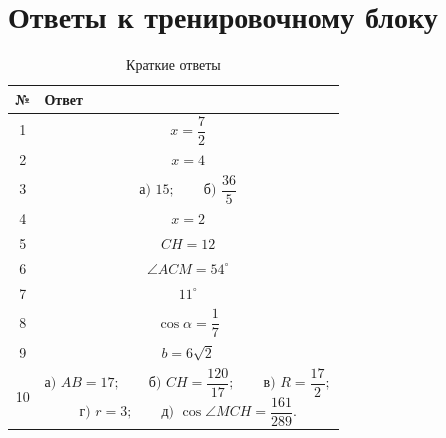 \documentclass[a4paper,12pt]{article}
\begin{document}

\newpage
\section*{\textcolor{darkaccent}{Ответы к тренировочному блоку}}

\renewcommand{\arraystretch}{1.45}

\begin{table}[ht]
\centering
\caption{Краткие ответы}
\begin{tabularx}{\linewidth}{@{}cX@{}}
\toprule
\textbf{№} & \textbf{Ответ} \\
\midrule

1 &
\[
x=\frac72
\]
\\

2 &
\[
x=4
\]
\\

3 &
\[
\text{а) }15;
\qquad
\text{б) }\frac{36}{5}
\]
\\

4 &
\[
x=2
\]
\\

5 &
\[
CH=12
\]
\\

6 &
\[
\angle ACM=54^\circ
\]
\\

7 &
\[
11^\circ
\]
\\

8 &
\[
\cos\alpha=\frac17
\]
\\

9 &
\[
b=6\sqrt2
\]
\\

10 &
\[
\text{а) }AB=17;
\qquad
\text{б) }CH=\frac{120}{17};
\qquad
\text{в) }R=\frac{17}{2};
\]
\[
\text{г) }r=3;
\qquad
\text{д) }\cos\angle MCH=\frac{161}{289}.
\]
\\

\bottomrule
\end{tabularx}
\end{table}
\end{document}
